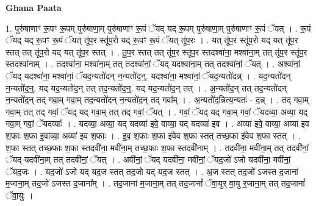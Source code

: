 \documentclass[17pt]{extarticle}
\begin{document}
\textbf{Ghana Paata } \newline

1. पुरु॑षाणाꣳ रू॒पꣳ रू॒पम् पुरु॑षाणा॒म् पुरु॑षाणाꣳ रू॒पं ॅयद् यद् रू॒पम् पुरु॑षाणा॒म् पुरु॑षाणाꣳ रू॒पं ॅयत् । . रू॒पं ॅयद् यद् रू॒पꣳ रू॒पं ॅयत् तू॑प॒र स्तू॑प॒रो यद् रू॒पꣳ रू॒पं ॅयत् तू॑प॒रः । . यत् तू॑प॒र स्तू॑प॒रो यद् यत् तू॑प॒र स्तत् तत् तू॑प॒रो यद् यत् तू॑प॒र स्तत् । . तू॒प॒र स्तत् तत् तू॑प॒र स्तू॑प॒र स्तदश्वा॑ना॒ मश्वा॑ना॒म् तत् तू॑प॒र स्तू॑प॒र स्तदश्वा॑नाम् । . तदश्वा॑ना॒ मश्वा॑ना॒म् तत् तदश्वा॑नां॒ ॅयद् यदश्वा॑ना॒म् तत् तदश्वा॑नां॒ ॅयत् । . अश्वा॑नां॒ ॅयद् यदश्वा॑ना॒ मश्वा॑नां॒ ॅयद॒न्यतो॑दन् न॒न्यतो॑द॒न्॒. यदश्वा॑ना॒ मश्वा॑नां॒ ॅयद॒न्यतो॑दन्न् । . यद॒न्यतो॑दन् न॒न्यतो॑द॒न्॒. यद् यद॒न्यतो॑द॒न् तत् तद॒न्यतो॑द॒न्॒. यद् यद॒न्यतो॑द॒न् तत् । . अ॒न्यतो॑द॒न् तत् तद॒न्यतो॑दन् न॒न्यतो॑द॒न् तद् गवा॒म् गवा॒म् तद॒न्यतो॑दन् न॒न्यतो॑द॒न् तद् गवा᳚म् । . अ॒न्यतो॑द॒न्नित्य॒न्यतः॑ - द॒न्न् । . तद् गवा॒म् गवा॒म् तत् तद् गवां॒ ॅयद् यद् गवा॒म् तत् तद् गवां॒ ॅयत् । . गवां॒ ॅयद् यद् गवा॒म् गवां॒ ॅयदव्या॒ अव्या॒ यद् गवा॒म् गवां॒ ॅयदव्याः᳚ । . यदव्या॒ अव्या॒ यद् यदव्या॑ इवे॒ वाव्या॒ यद् यदव्या॑ इव । . अव्या॑ इवे॒ वाव्या॒ अव्या॑ इव श॒फाः श॒फा इ॒वाव्या॒ अव्या॑ इव श॒फाः । . इ॒व॒ श॒फाः श॒फा इ॑वेव श॒फा स्तत् तच्छ॒फा इ॑वेव श॒फा स्तत् । . श॒फा स्तत् तच्छ॒फाः श॒फा स्तदवी॑ना॒ मवी॑ना॒म् तच्छ॒फाः श॒फा स्तदवी॑नाम् । . तदवी॑ना॒ मवी॑ना॒म् तत् तदवी॑नां॒ ॅयद् यदवी॑ना॒म् तत् तदवी॑नां॒ ॅयत् । . अवी॑नां॒ ॅयद् यदवी॑ना॒ मवी॑नां॒ ॅयद॒जो॑ ऽजो यदवी॑ना॒ मवी॑नां॒ ॅयद॒जः । . यद॒जो॑ ऽजो यद् यद॒ज स्तत् तद॒जो यद् यद॒ज स्तत् । . अ॒ज स्तत् तद॒जो॑ ऽजस्त द॒जाना॑ म॒जाना॒म् तद॒जो॑ ऽजस्त द॒जाना᳚म् । . तद॒जाना॑ म॒जाना॒म् तत् तद॒जानां᳚ ॅवा॒युर् वा॒यु र॒जाना॒म् तत् तद॒जानां᳚ ॅवा॒युः । \newline
\end{document}
